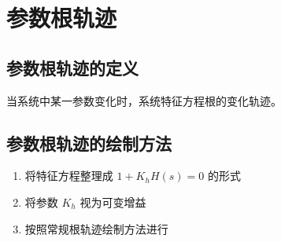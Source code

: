 \section{参数根轨迹}

\subsection{参数根轨迹的定义}
当系统中某一参数变化时，系统特征方程根的变化轨迹。

\subsection{参数根轨迹的绘制方法}
\begin{enumerate}
    \item 将特征方程整理成 $1 + K_h H(s) = 0$ 的形式
    \item 将参数 $K_h$ 视为可变增益
    \item 按照常规根轨迹绘制方法进行
\end{enumerate}
